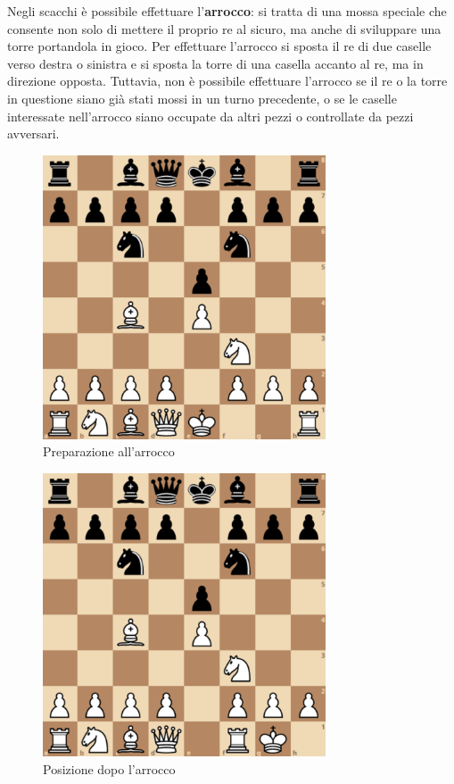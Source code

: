 Negli scacchi è possibile effettuare l'\textbf{arrocco}: si tratta di una mossa speciale che consente non solo di mettere il proprio re al sicuro, ma anche di sviluppare una torre portandola in gioco. Per effettuare l'arrocco si sposta il re di due caselle verso destra o sinistra e si sposta la torre di una casella accanto al re, ma in direzione opposta. Tuttavia, non è possibile effettuare l'arrocco se il re o la torre in questione siano già stati mossi in un turno precedente, o se le caselle interessate nell'arrocco siano occupate da altri pezzi o controllate da pezzi avversari. 
\begin{figure}[!htb]
    \includegraphics[width=8.4cm]{frontmatter/figure/arrocco_prima.pdf}
    \centering
    \caption{Preparazione all'arrocco}
    \label{fig:checkmate}
\end{figure}
\begin{figure}[!htb]
    \includegraphics[width=8.4cm]{frontmatter/figure/arrocco_dopo.pdf}
    \centering
    \caption{Posizione dopo l'arrocco}
    \label{fig:checkmate}
\end{figure}

